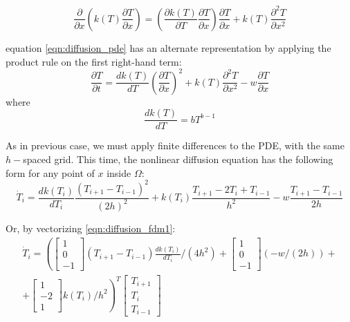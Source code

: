 \begin{equation}
  \frac{\partial }{\partial x}\left(k(T) \frac{\partial T}{\partial x}\right)   = \left(\frac{\partial k(T)}{\partial T}\frac{\partial T}{\partial x}\right)\frac{\partial T}{\partial x} + k(T)\frac{\partial^2 T}{\partial x^2}
\end{equation}

\color{black}
equation \eqref{eqn:diffusion_pde} has an alternate representation by applying the product rule on the first right-hand term:
\begin{equation} \label{eqn:diffusion_pde2}
  \frac{\partial T}{\partial t} = \frac{d k(T) }{d T}\left( \frac{\partial T}{\partial x}\right)^2 + k(T)\frac{\partial^{2} T}{\partial x^2}  - w\frac{\partial T}{\partial x} 
\end{equation}
where
\begin{equation}
    \frac{dk(T)}{dT} = bT^{b-1}
\end{equation}

As in previous case, we must apply finite differences to the PDE, with the same $h-$spaced grid.
This time, the nonlinear diffusion equation has the following form for any point of $x$ inside $\Omega$:
\begin{equation} \label{eqn:diffusion_fdm1}
  \dot{T}_i = \frac{d k(T_i) }{d T_i}\frac{(T_{i+1} - T_{i-1})^2}{(2h)^2} + k(T_i)\frac{T_{i+1} - 2T_i + T_{i-1}}{h^2} - w\frac{T_{i+1} - T_{i-1}}{2h} 
\end{equation}



Or, by vectorizing \ref{eqn:diffusion_fdm1}:
\begin{multline} \label{eqn:diffusion_fdm2}
  \dot{T}_i =
  \left(
  \begin{bmatrix}
     1\\
     0\\
     -1
  \end{bmatrix}
  (T_{i+1} - T_{i-1})\frac{d k(T_i) }{d T_i}/(4h^2) +
  \begin{bmatrix}
     1\\
     0\\
     -1
  \end{bmatrix}(- w/(2h)) + \right . \\
      \left . +
  \begin{bmatrix}
     1\\
     -2\\
     1
  \end{bmatrix}k(T_i)/h^2\right)^T
  \begin{bmatrix}
      T_{i+1}\\
      T_i\\
      T_{i-1}
  \end{bmatrix}
\end{multline}




